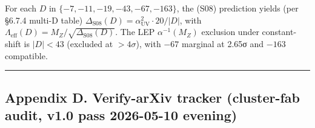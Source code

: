 \documentclass[
  11pt,
  a4paper,
]{article}
\begin{document}
For each \(D\) in \(\{-7, -11, -19, -43, -67, -163\}\), the (S08) prediction yields (per §6.7.4 multi-D table) \(\Delta_{\mathrm{S08}}(D) = \alpha_{\mathrm{UV}}^2 \cdot 20/|D|\), with \(\Lambda_{\mathrm{eff}}(D) = M_Z/\sqrt{\Delta_{\mathrm{S08}}(D)}\). The LEP \(\alpha^{-1}(M_Z)\) exclusion under constant-shift is \(|D| < 43\) (excluded at \(> 4\sigma\)), with \(-67\) marginal at 2.65σ and \(-163\) compatible.

\begin{center}\rule{0.5\linewidth}{0.5pt}\end{center}

\hypertarget{appendix-d.-verify-arxiv-tracker-cluster-fab-audit-v1.0-pass-2026-05-10-evening}{%
\subsection{Appendix D. Verify-arXiv tracker (cluster-fab audit, v1.0 pass 2026-05-10 evening)}\label{appendix-d.-verify-arxiv-tracker-cluster-fab-audit-v1.0-pass-2026-05-10-evening}}
\end{document}
